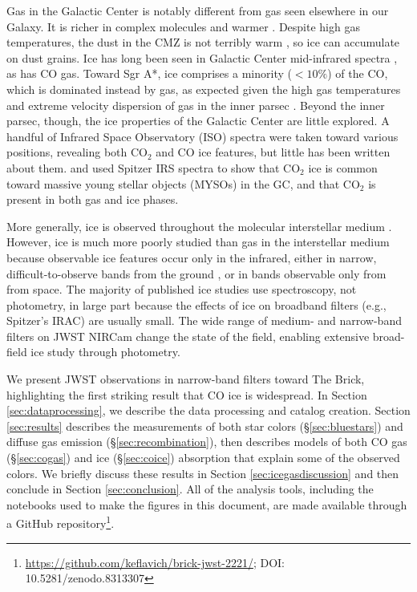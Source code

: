 \documentclass[times,astrosymb,twocolumn]{aastex631}
\def\rr#1{#1}
\begin{document}
Gas in the Galactic Center is notably different from gas seen elsewhere in our Galaxy.
It is richer in complex molecules \citep{Jones2012} and warmer \citep{Ao2013,Ginsburg2016,Krieger2017}.
Despite high gas temperatures, the dust in the CMZ is not terribly warm \citep{Tang2021}, so ice can accumulate on dust grains.
Ice has long been seen in Galactic Center mid-infrared spectra \citep{Lutz1996,Chiar2000,Moneti2001}, as has CO gas. 
Toward Sgr A*, ice comprises a minority ($<10\%$) of the CO, which is dominated instead by gas, as expected given the high gas temperatures and extreme velocity dispersion of gas in the inner parsec \citep{Moneti2001,Moultaka2009}.
Beyond the inner parsec, though, the ice properties of the Galactic Center are little explored.
A handful of Infrared Space Observatory (ISO) spectra were taken toward various positions, revealing both CO$_2$ and CO ice features, but little has been written about them.
\citet{An2011} and \citet{Jang2022} used Spitzer IRS spectra to show that CO$_2$ ice is common toward massive young stellar objects (MYSOs) in the GC, and that CO$_2$ is present in both gas and ice phases.

\rr{More generally, ice is observed throughout the molecular interstellar medium \citep{Boogert2015}.
However, ice is much more poorly studied than gas in the interstellar medium because observable ice features occur only in the infrared, either in narrow, difficult-to-observe bands from the ground \citep[e.g.][]{Gunay2020,Gunay2022}, or in bands observable only from from space.
The majority of published ice studies use spectroscopy, not photometry, in large part because the effects of ice on broadband filters (e.g., Spitzer's IRAC) are usually small.
The wide range of medium- and narrow-band filters on JWST NIRCam change the state of the field, enabling extensive broad-field ice study through photometry.
}

We present JWST observations in narrow-band filters toward The Brick, highlighting the first striking result that CO ice is widespread.
In Section \ref{sec:dataprocessing}, we describe the data processing and catalog creation.
Section \ref{sec:results} describes the measurements of both star colors (\S \ref{sec:bluestars}) and diffuse gas emission (\S \ref{sec:recombination}), then describes models of both CO gas (\S \ref{sec:cogas}) and ice (\S \ref{sec:coice}) absorption that explain some of the observed colors.
We briefly discuss these results in Section \ref{sec:icegasdiscussion} and then conclude in Section \ref{sec:conclusion}.
All of the analysis tools, including the notebooks used to make the figures in this document, are made available through a GitHub repository\footnote{\url{https://github.com/keflavich/brick-jwst-2221/};  DOI: 10.5281/zenodo.8313307}.
\end{document}
